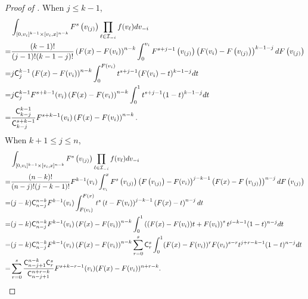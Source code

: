 \begin{proof}[Proof of ]
When $j\leq k-1$,
\begin{align*}
    &\int_{ [0,v_i]^{k-1}\times[v_i,x]^{n-k}}F^s\left(v_{(j)}\right) \prod_{\ell \in \mathcal{I}_{-i}}f(v_{\ell})dv_{-i} \\
    =& \frac{(k-1)!}{(j-1)!(k-1-j)!}\left(F(x)-F(v_i)\right)^{n-k}\int_0^{v_i}F^{s+j-1}\left(v_{(j)}\right)\left(F(v_i) - F\left(v_{(j)}\right)\right)^{k-1-j}dF\left(v_{(j)}\right)\\
    =& j\mathsf{C}_j^{k-1} \left(F(x)-F(v_i)\right)^{n-k} \int_0^{F(v_i)}t^{s+j-1}(F(v_i) - t)^{k-1-j}dt\\
    =& j\mathsf{C}_j^{k-1} F^{s+k-1}(v_i)\left(F(x)-F(v_i)\right)^{n-k} \int_0^1t^{s+j-1}(1-t)^{k-1-j}dt \\
    =& \frac{\mathsf{C}^{k-1}_{k-j}}{\mathsf{C}^{s+k-1}_{k-j}} F^{s+k-1}(v_i)\left(F(x)-F(v_i)\right)^{n-k}.
\end{align*}
When $k+1\leq j \leq n$,
\begin{align*}
    &\int_{[0,v_i]^{k-1}\times[v_i,x]^{n-k}}F^s\left(v_{(j)}\right) \prod_{\ell \in \mathcal{I}_{-i}}f(v_{\ell})dv_{-i} \\
    =& \frac{(n-k)!}{(n-j)!(j-k-1)!}F^{k-1}(v_i)\int_{v_i}^xF^{s}\left(v_{(j)}\right)\left( F\left(v_{(j)}\right) - F(v_i)\right)^{j-k-1}\left( F(x) - F\left(v_{(j)}\right)\right)^{n-j}dF\left(v_{(j)}\right)\\
    =& (j-k)\mathsf{C}_{n-j}^{n-k} F^{k-1}(v_i)\int_{F(v_i)}^{F(x)}t^{s}\left( t - F(v_i)\right)^{j-k-1}\left( F(x) - t\right)^{n-j}dt\\
    =& (j-k)\mathsf{C}_{n-j}^{n-k} F^{k-1}(v_i)\left(F(x)-F(v_i)\right)^{n-k} \int_0^1\left((F(x)-F(v_i))t+F(v_i)\right)^st^{j-k-1}(1-t)^{n-j}dt \\
    =& (j-k)\mathsf{C}_{n-j}^{n-k} F^{k-1}(v_i)\left(F(x)-F(v_i)\right)^{n-k} \sum_{r=0}^s \mathsf{C}_{r}^s \int_0^1(F(x)-F(v_i))^rF(v_i)^{s-r}t^{j+r-k-1}(1-t)^{n-j}dt\\
    =&\sum_{r=0}^s\frac{\mathsf{C}_{n-j+1}^{n-k}\mathsf{C}_r^s}{\mathsf{C}_{n-j+1}^{n+r-k}}F^{s+k-r-1}(v_i)(F(x)-F(v_i))^{n+r-k}.
\end{align*}
\end{proof}
